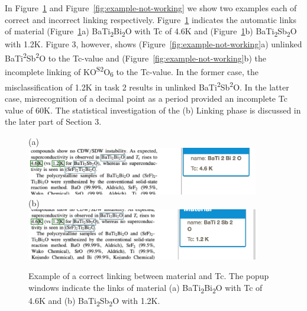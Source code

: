 \documentclass{article}[a4]
\begin{document}
In Figure~\ref{fig:example-working} and Figure~\ref{fig:example-not-working} we show two examples each of correct and incorrect linking respectively. Figure~\ref{fig:example-working} indicates the automatic links of material (Figure~\ref{fig:example-working}a) BaTi\textsubscript{2}Bi\textsubscript{2}O with Tc of 4.6K and (Figure~\ref{fig:example-working}b) BaTi\textsubscript{2}Sb\textsubscript{2}O with 1.2K. Figure 3, however, shows (Figure~\ref{fig:example-not-working}a) unlinked BaTi\textsuperscript{2}Sb\textsuperscript{2}O to the Tc-value and (Figure~\ref{fig:example-not-working}b) the incomplete linking of KO\textsuperscript{S2}O\textsubscript{6} to the Tc-value. In the former case, the misclassification of 1.2K in task 2 results in unlinked BaTi\textsuperscript{2}Sb\textsuperscript{2}O. In the latter case, misrecognition of a decimal point as a period provided an incomplete Tc value of 60K. The statistical investigation of the (b) Linking phase is discussed in the later part of Section 3.


\begin{figure}[h]
    \centering
    (a) \\
    \includegraphics[width=4in]{example1} \\
    (b) \\
    \includegraphics[width=4in]{example2}
    \caption{Example of a correct linking between material and Tc. The popup windows indicate the links of material (a) BaTi\textsubscript{2}Bi\textsubscript{2}O with Tc of 4.6K and (b) BaTi\textsubscript{2}Sb\textsubscript{2}O with 1.2K.}
    \label{fig:example-working}
\end{figure}
\end{document}
